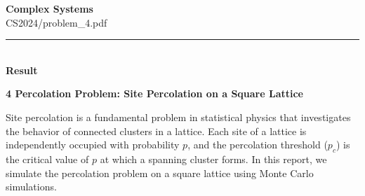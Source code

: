 \documentclass[10pt,letterpaper, onecolumn]{report}
\begin{document}
\begingroup
    \centering
    \LARGE \textbf{Complex Systems} \\
    \large CS2024/problem\_4.pdf \\[0.5em]
\endgroup

\begin{flushleft}
    \rule{\textwidth}{0.4pt} \\ %
    \textbf{Result}
\end{flushleft}

\begin{flushleft}
    \textbf{4 Percolation Problem: Site Percolation on a Square Lattice}
    \hfill\break
    \setlength{\parindent}{1.5em} %
    \setlength{\parskip}{0.5em}   %

    Site percolation is a fundamental problem in statistical physics that investigates the behavior of connected clusters in a lattice. Each site of a lattice is independently occupied with probability \( p \), and the percolation threshold (\( p_c \)) is the critical value of \( p \) at which a spanning cluster forms. In this report, we simulate the percolation problem on a square lattice using Monte Carlo simulations.
\end{flushleft}
\end{document}
